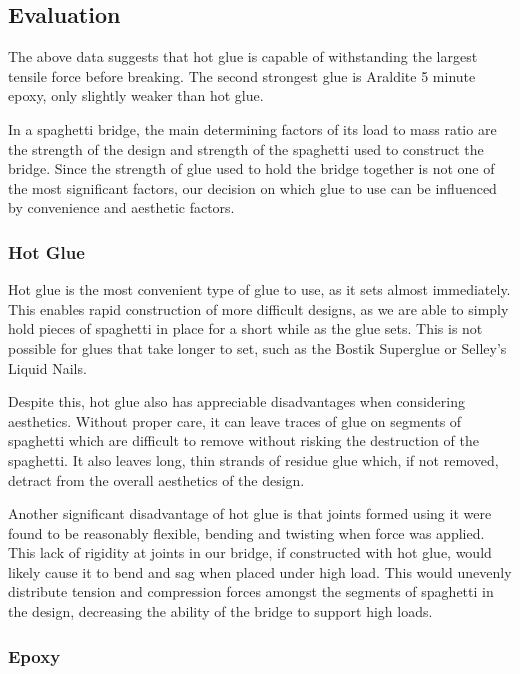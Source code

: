 \documentclass[a4paper,11pt]{article}
\begin{document}
\subsection{Evaluation}

The above data suggests that hot glue is capable of withstanding the largest
tensile force before breaking.
The second strongest glue is Araldite 5 minute epoxy, only slightly weaker
than hot glue.

In a spaghetti bridge, the main determining factors of its load to mass ratio
are the strength of the design and strength of the spaghetti used to construct
the bridge.
Since the strength of glue used to hold the bridge together is not one of the
most significant factors, our decision on which glue to use can be influenced
by convenience and aesthetic factors.


\subsubsection{Hot Glue}

Hot glue is the most convenient type of glue to use, as it sets almost
immediately.
This enables rapid construction of more difficult designs, as we are able to
simply hold pieces of spaghetti in place for a short while as the glue sets.
This is not possible for glues that take longer to set, such as the Bostik
Superglue or Selley's Liquid Nails.

Despite this, hot glue also has appreciable disadvantages when considering
aesthetics.
Without proper care, it can leave traces of glue on segments of spaghetti which
are difficult to remove without risking the destruction of the spaghetti.
It also leaves long, thin strands of residue glue which, if not removed,
detract from the overall aesthetics of the design.

Another significant disadvantage of hot glue is that joints formed using it were
found to be reasonably flexible, bending and twisting when force was applied.
This lack of rigidity at joints in our bridge, if constructed with hot glue,
would likely cause it to bend and sag when placed under high load.
This would unevenly distribute tension and compression forces amongst the
segments of spaghetti in the design, decreasing the ability of the bridge to
support high loads.


\subsubsection{Epoxy}
\end{document}

